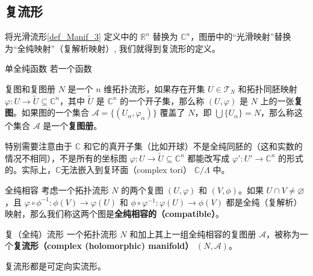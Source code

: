 

\subsection{复流形}

将光滑流形\autoref{def_Manif_3} 定义中的 $\mathbb{R}^n$ 替换为 $\mathbb{C}^n$，图册中的“光滑映射”替换为“全纯映射”（复解析映射）, 我们就得到复流形的定义。

\begin{definition}{单全纯函数}
若一个函数
\end{definition}


\begin{definition}{复图和复图册}
$N$ 是一个 $n$ 维拓扑流形，如果存在开集 $U \in \mathcal{T}_N$ 和拓扑同胚映射 $\varphi: U \rightarrow \tilde{U} \subseteq \mathbb{C}^n$，其中 $\tilde{U}$ 是 $\mathbb{C}^n$ 的一个开子集，那么称 $(U,\varphi)$ 是 $N$ 上的一张\textbf{复图}。如果图的一个集合 $\mathcal{A}=\{(U_\alpha, \varphi_\alpha)\}$ 覆盖了 $N$，即 $\bigcup\{U_\alpha\}=N$，那么称这个集合 $\mathcal{A}$ 是一个\textbf{复图册}。
\end{definition}

特别需要注意由于 $\mathbb{C}$ 和它的真开子集（比如开球）不是全纯同胚的（这和实数的情况不相同），不是所有的坐标图 $\varphi: U \rightarrow \tilde{U} \subseteq \mathbb{C}^n$ 都能改写成 $\varphi': U' \rightarrow \mathbb{C}^n$ 的形式的。实际上，$\mathbb{C}$无法嵌入到复环面（complex tori） $\mathbb{C} / \Lambda$ 中。

\begin{definition}{全纯相容}
考虑一个拓扑流形 $N$ 的两个复图 $(U, \varphi)$ 和 $(V, \phi)$。如果 $U \cap V \neq \varnothing$，且 $\varphi \circ \phi^{-1}: \phi(V) \rightarrow \varphi(U)$ 和 $\phi \circ \varphi^{-1}: \varphi(U) \rightarrow \phi(V)$ 都是全纯（复解析）映射，那么我们称这两个图是\textbf{全纯相容的（compatible）}。
\end{definition}

\begin{definition}{复（全纯）流形}\label{def_CMani_1}
一个拓扑流形 $N$ 和加上其上一组全纯相容的复图册 $\mathcal{A}$，被称为一个\textbf{复流形（complex (holomorphic) manifold）} $(N, \mathcal{A})$。
\end{definition}

\begin{theorem}{}
复流形都是可定向实流形。
\end{theorem}

